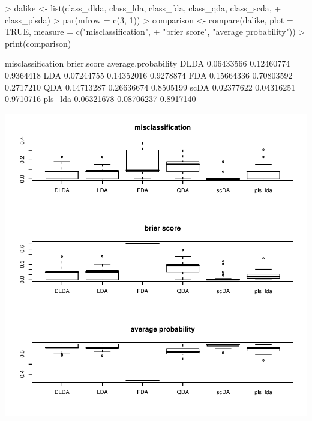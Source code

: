\begin{Schunk}
\begin{Sinput}
> dalike <- list(class_dlda, class_lda, class_fda, class_qda, class_scda, 
+     class_plsda)
> par(mfrow = c(3, 1))
> comparison <- compare(dalike, plot = TRUE, measure = c("misclassification", 
+     "brier score", "average probability"))
> print(comparison)
\end{Sinput}
\begin{Soutput}
        misclassification brier.score average.probability
DLDA           0.06433566  0.12460774           0.9364418
LDA            0.07244755  0.14352016           0.9278874
FDA            0.15664336  0.70803592           0.2717210
QDA            0.14713287  0.26636674           0.8505199
scDA           0.02377622  0.04316251           0.9710716
pls_lda        0.06321678  0.08706237           0.8917140
\end{Soutput}
\end{Schunk}
\includegraphics{CMA_annelaure-026}









